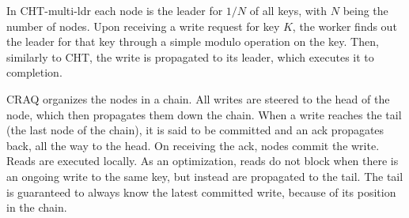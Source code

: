\begin{comment}
Let us briefly discuss a few implementation details.
Firstly note that reads are subtly different than ZAB and Derecho.
Specifically, because reads are lin, it must be that once a read returns a value, a later read can never return an earlier value. To achieve this, we maintain a state variable with each key, initially denoting that the key is \qt{valid} and can be read. Upon receiving the first round of a write, the state transitions to \qt{invalid}, denoting that the value cannot be read until the write is committed. Reads that find a key in invalid state will be buffered to be retried in the future. Note that this blocking of lin reads is inevitable as proven in the CHT paper~\cite{Chandra:2016}. 

The implementation of writes are again similar to ZAB and MP with a subtle difference.
In order to support multi-threading, we have added a version to each key (as part of its metadata).
The per-key version is incremented by the leader, each time it writes the key. Then the version is sent along with the write in the first broadcast round.
To understand why the version is necessary assume that two different workers of the leader attempt to write the same key concurrently. 
The two writes will serialize at he leader node due to the concurrency control at the KVS: whoever grabs the lock first will also write first.
However, that ordering of the two writes must be honoured in the follower nodes. This will be achieved with the per-key version. Plainly, the version of the later write will be bigger, allowing the followers to serialize the writes in the correct order.
\end{comment}

In CHT-multi-ldr each node is the leader for $1/N$ of all keys, with $N$ being the number of nodes. 
Upon receiving a write request for key $K$, the worker finds out the leader for that key through a simple modulo operation on the key. Then, similarly to CHT, the write is propagated to its leader, which executes it to completion. %


CRAQ organizes the nodes in a chain. All writes are steered to the head of the node, which then propagates them down the chain. When a write reaches the tail (\ie the last node of the chain), it is said to be committed and an ack propagates back, all the way to the head. On receiving the ack, nodes commit the write.
Reads are executed locally. As an optimization, reads do not block when there is an ongoing write to the same key, but instead are propagated to the tail. The tail is guaranteed to always know the latest committed write, because of its position in the chain. 

